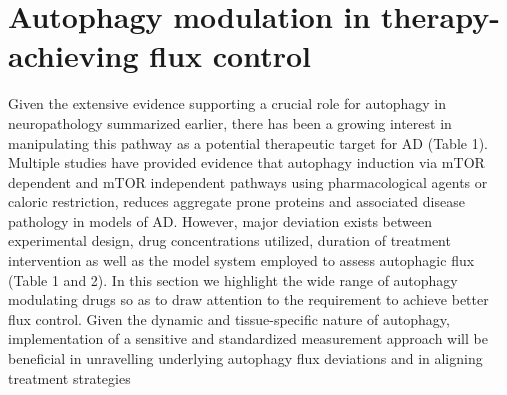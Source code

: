 \section{Autophagy modulation in therapy-achieving flux control}
Given the extensive evidence supporting a crucial role for autophagy in neuropathology summarized earlier, there has been a growing interest in manipulating this pathway as a potential therapeutic target for AD (Table 1). Multiple studies have provided evidence that autophagy induction via mTOR dependent and mTOR independent pathways using pharmacological agents or caloric restriction, reduces aggregate prone proteins and associated disease pathology in models of AD. However, major deviation exists between experimental design, drug concentrations utilized, duration of treatment intervention as well as the model system employed to assess autophagic flux (Table 1 and 2). In this section we highlight the wide range of autophagy modulating drugs so as to draw attention to the requirement to achieve better flux control. Given the dynamic and tissue-specific nature of autophagy, implementation of a sensitive and standardized measurement approach will be beneficial in unravelling underlying autophagy flux deviations and in aligning treatment strategies 



